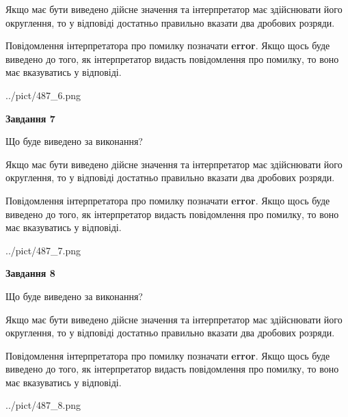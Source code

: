 \documentclass[12pt, ukrainian]{article}
\begin{document}
{\begin {Large}
Якщо має бути виведено дійсне значення та інтерпретатор має здійснювати його округлення, 
то у відповіді достатньо правильно вказати два дробових розряди.

Повідомлення інтерпретатора про помилку позначати \textbf{error}.
Якщо щось буде виведено до того, як інтерпретатор видасть повідомлення про помилку, 
то воно має вказуватись у відповіді. \par

\begin{center}
	{../pict/487_6.png}
\end{center}
\newpage

{\begin {center}\textbf{Завдання 7}\end {center}}\par
Що буде виведено за виконання? \par

Якщо має бути виведено дійсне значення та інтерпретатор має здійснювати його округлення, 
то у відповіді достатньо правильно вказати два дробових розряди.

Повідомлення інтерпретатора про помилку позначати \textbf{error}.
Якщо щось буде виведено до того, як інтерпретатор видасть повідомлення про помилку, 
то воно має вказуватись у відповіді. \par

\begin{center}
	{../pict/487_7.png}
\end{center}
\newpage

{\begin {center}\textbf{Завдання 8}\end {center}}\par
Що буде виведено за виконання? \par

Якщо має бути виведено дійсне значення та інтерпретатор має здійснювати його округлення, 
то у відповіді достатньо правильно вказати два дробових розряди.

Повідомлення інтерпретатора про помилку позначати \textbf{error}.
Якщо щось буде виведено до того, як інтерпретатор видасть повідомлення про помилку, 
то воно має вказуватись у відповіді. \par

\begin{center}
	{../pict/487_8.png}
\end{center}
\newpage


\end{Large}}
\end{document}
